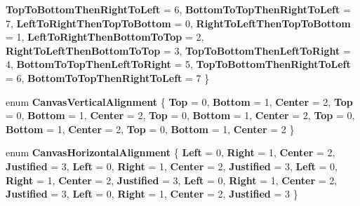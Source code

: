 \begin{DoxyCompactItemize}
{\bfseries Top\+To\+Bottom\+Then\+Right\+To\+Left} = 6, 
{\bfseries Bottom\+To\+Top\+Then\+Right\+To\+Left} = 7, 
\newline
{\bfseries Left\+To\+Right\+Then\+Top\+To\+Bottom} = 0, 
{\bfseries Right\+To\+Left\+Then\+Top\+To\+Bottom} = 1, 
{\bfseries Left\+To\+Right\+Then\+Bottom\+To\+Top} = 2, 
{\bfseries Right\+To\+Left\+Then\+Bottom\+To\+Top} = 3, 
\newline
{\bfseries Top\+To\+Bottom\+Then\+Left\+To\+Right} = 4, 
{\bfseries Bottom\+To\+Top\+Then\+Left\+To\+Right} = 5, 
{\bfseries Top\+To\+Bottom\+Then\+Right\+To\+Left} = 6, 
{\bfseries Bottom\+To\+Top\+Then\+Right\+To\+Left} = 7
 \}
\item 
\mbox{\label{namespace_microsoft_1_1_graphics_1_1_canvas_1_1_text_a152840fdbab49a06690e74695359e3fd}} 
enum {\bfseries Canvas\+Vertical\+Alignment} \{ \newline
{\bfseries Top} = 0, 
{\bfseries Bottom} = 1, 
{\bfseries Center} = 2, 
{\bfseries Top} = 0, 
\newline
{\bfseries Bottom} = 1, 
{\bfseries Center} = 2, 
{\bfseries Top} = 0, 
{\bfseries Bottom} = 1, 
\newline
{\bfseries Center} = 2, 
{\bfseries Top} = 0, 
{\bfseries Bottom} = 1, 
{\bfseries Center} = 2, 
\newline
{\bfseries Top} = 0, 
{\bfseries Bottom} = 1, 
{\bfseries Center} = 2
 \}
\item 
\mbox{\label{namespace_microsoft_1_1_graphics_1_1_canvas_1_1_text_afbe7037cb35da011cc144d6cb2d328f5}} 
enum {\bfseries Canvas\+Horizontal\+Alignment} \{ \newline
{\bfseries Left} = 0, 
{\bfseries Right} = 1, 
{\bfseries Center} = 2, 
{\bfseries Justified} = 3, 
\newline
{\bfseries Left} = 0, 
{\bfseries Right} = 1, 
{\bfseries Center} = 2, 
{\bfseries Justified} = 3, 
\newline
{\bfseries Left} = 0, 
{\bfseries Right} = 1, 
{\bfseries Center} = 2, 
{\bfseries Justified} = 3, 
\newline
{\bfseries Left} = 0, 
{\bfseries Right} = 1, 
{\bfseries Center} = 2, 
{\bfseries Justified} = 3, 
\newline
{\bfseries Left} = 0, 
{\bfseries Right} = 1, 
{\bfseries Center} = 2, 
{\bfseries Justified} = 3
 \}
\item 

\end{DoxyCompactItemize}
